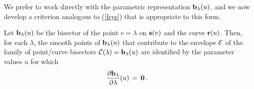 {We prefer to work directly with the parametric representation
${\bf b}_\lambda(u)$, and we now develop a criterion analogous
to (\ref{fsys}) that is appropriate to this form.

\begin{thm}
Let ${\bf b}_\lambda(u)$ be the bisector of the point $v=\lambda$
on ${\bf s}(v)$ and the curve ${\bf r}(u)$. Then, for each $\lambda$,
the smooth points of ${\bf b}_\lambda(u)$ that
contribute to the envelope ${\cal E}$ of the family of point/curve
bisectors ${\cal C}(\lambda)={\bf b}_\lambda(u)$ are identified by
the parameter values $u$ for which
\begin{equation} \label{blambda}
{\partial{\bf b}_\lambda \over \partial\lambda}(u) \,=\, {\bf 0} \,.
\end{equation}
\end{thm}

}
